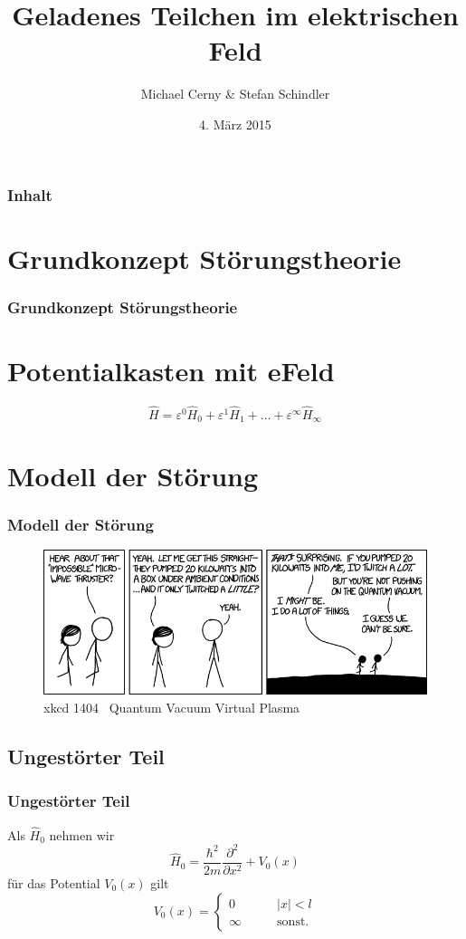\documentclass[aspectratio=169]{beamer}
\title{ Geladenes Teilchen im elektrischen Feld }
\author{ Michael Cerny \& Stefan Schindler }
\date{ 4. M\"arz 2015 }
\begin{document}
\begin{frame}
  \titlepage
\end{frame}

\begin{frame}
  \frametitle{ Inhalt }
  \tableofcontents
\end{frame}

\section{ Grundkonzept St\"orungstheorie } 
\begin{frame}\frametitle{ Grundkonzept St\"orungstheorie } 
  \section{ Potentialkasten mit eFeld }
  \[
  \hat{H} = \varepsilon^0 \hat H_0 + \varepsilon^1 \hat H_1 + \ldots + \varepsilon^\infty \hat H_\infty
  \]
\end{frame}

\section{ Modell der St\"orung }
\begin{frame}
  \frametitle{ Modell der St\"orung }
  \begin{figure}
    \centering
    \includegraphics[width=14cm]{./1404_quantum_vacuum_virtual_plasma.png}
    \caption{xkcd 1404 \textendash \ Quantum Vacuum Virtual Plasma}
    \label{abb:1404_quantum_vacuum_virtual_plasma}
  \end{figure}

\end{frame}


\subsection{ Ungest\"orter Teil }
\begin{frame}
  \frametitle{ Ungest\"orter Teil }
  Als $\hat H_0$ nehmen wir
  \[
    \hat H_0 = \frac{\hbar^2}{2m} \frac{\partial^2}{\partial x^2} + V_0(x)
  \]
  f\"ur das Potential $V_0(x)$ gilt
  \[
    V_0(x)=\begin{cases}
      0       & \qquad |x|<l\\
      \infty  & \qquad\text{sonst.}
    \end{cases}
  \]
\end{frame}
\end{document}
